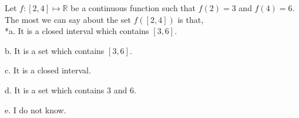 
Let \(f: [2,4] \mapsto \mathbb{R}\) be a continuous function such that 
\(f(2) = 3\) and \(f(4) = 6\). The most we can say about the set \(f([2,4])\)
is that,\\

*a. It is a closed interval which contains \([3,6]\).

b. It is a set which contains \([3,6]\).

c. It is a closed interval.

d. It is a set which contains 3 and 6.

e. I do not know.\\
